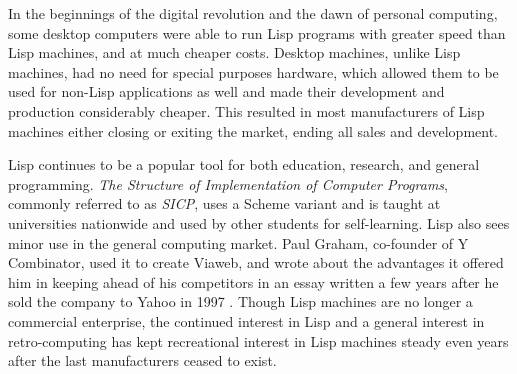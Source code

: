 \documentclass[journal]{IEEEtran}
\begin{document}
In the beginnings of the digital revolution and the dawn of personal computing, some desktop computers were able to run Lisp programs with greater speed than Lisp machines, and at much cheaper costs. Desktop machines, unlike Lisp machines, had no need for special purposes hardware, which allowed them to be used for non-Lisp applications as well and made their development and production considerably cheaper. This resulted in most manufacturers of Lisp machines either closing or exiting the market, ending all sales and development.

Lisp continues to be a popular tool for both education, research, and general programming. \textit{The Structure of Implementation of Computer Programs}, commonly referred to as \textit{SICP}, uses a Scheme variant and is taught at universities nationwide and used by other students for self-learning. Lisp also sees minor use in the general computing market. Paul Graham, co-founder of Y Combinator, used it to create Viaweb, and wrote about the advantages it offered him in keeping ahead of his competitors in an essay written a few years after he sold the company to Yahoo in 1997 \cite{graham}. Though Lisp machines are no longer a commercial enterprise, the continued interest in Lisp and a general interest in retro-computing has kept recreational interest in Lisp machines steady even years after the last manufacturers ceased to exist.

\printbibliography

\end{document}
